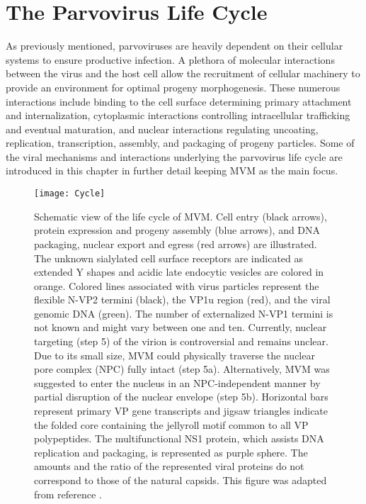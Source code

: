 
\chapter{The Parvovirus Life Cycle} %

\label{Chapter7} %


As previously mentioned, parvoviruses are heavily dependent on their cellular systems to ensure productive infection. A plethora of molecular interactions between the virus and the host cell allow the recruitment of cellular machinery to provide an environment for optimal progeny morphogenesis. These numerous interactions include binding to the cell surface determining primary attachment and internalization, cytoplasmic interactions controlling intracellular trafficking and eventual maturation, and nuclear interactions regulating uncoating, replication, transcription, assembly, and packaging of progeny particles. Some of the viral mechanisms and interactions underlying the parvovirus life cycle are introduced in this chapter in further detail keeping MVM as the main focus.     


\begin{figure}[H]
\centering
  \texttt{[image: Cycle]} \\[0.3cm]
  \caption[Life Cycle of MVM]
   {Schematic view of the life cycle of MVM. Cell entry (black arrows), protein expression and progeny assembly (blue arrows), and DNA packaging, nuclear export and egress (red arrows) are illustrated. The unknown sialylated cell surface receptors are indicated as extended Y shapes and acidic late endocytic vesicles are colored in orange. Colored lines associated with virus particles represent the flexible N-VP2 termini (black), the VP1u region (red), and the viral genomic DNA (green). The number of externalized N-VP1 termini is not known and might vary between one and ten. Currently, nuclear targeting (step 5) of the virion is controversial and remains unclear. Due to its small size, MVM could physically traverse the nuclear pore complex (NPC) fully intact (step 5a). Alternatively, MVM was suggested to enter the nucleus in an NPC-independent manner by partial disruption of the nuclear envelope (step 5b). Horizontal bars represent primary VP gene transcripts and jigsaw triangles indicate the folded core containing the jellyroll motif common to all VP polypeptides. The multifunctional NS1 protein, which assists DNA replication and packaging, is represented as purple sphere. The amounts and the ratio of the represented viral proteins do not correspond to those of the natural capsids. This figure was adapted from reference \cite{small}.  
} 
\label{Cycle}
\end{figure}



